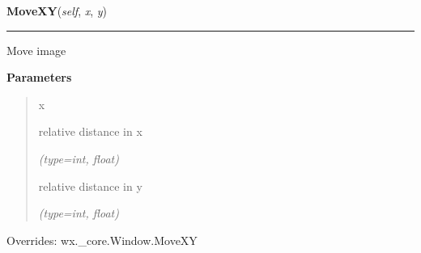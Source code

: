 \hspace{.8\funcindent}\begin{boxedminipage}{\funcwidth}

    \raggedright \textbf{MoveXY}(\textit{self}, \textit{x}, \textit{y})

    \vspace{-1.5ex}

    \rule{\textwidth}{0.5\fboxrule}
\setlength{\parskip}{2ex}
    Move image

\setlength{\parskip}{1ex}
      \textbf{Parameters}
      \vspace{-1ex}

      \begin{quote}
        \begin{Ventry}{x}

          \item[x]

          relative distance in x

            {\it (type=int, float)}

          \item[y]

          relative distance in y

            {\it (type=int, float)}

        \end{Ventry}

      \end{quote}

      Overrides: wx.\_core.Window.MoveXY

    \end{boxedminipage}

    \label{ImagePanel:ImagePanel:ScrollX}

    \vspace{0.5ex}

